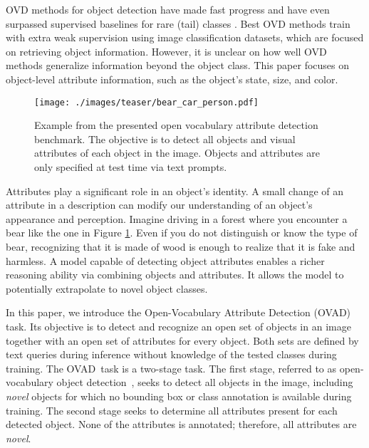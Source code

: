 \documentclass[10pt,twocolumn,letterpaper]{article}
\newcommand{\taskname}{OVAD}
\begin{document}
 
OVD methods for object detection have made fast progress and have even surpassed supervised baselines for rare (tail) classes \cite{vild}. Best OVD methods \cite{vild, detic, regionclip, bridging} train with extra weak supervision using image classification datasets, which are focused on retrieving object information.
However, it is unclear on how well OVD methods generalize information beyond the object class. This paper focuses on object-level attribute information, such as the object's state, size, and color.







\begin{figure}[t]
\texttt{[image: ./images/teaser/bear\_car\_person.pdf]}
\centering
\caption{Example from the presented open vocabulary attribute detection benchmark. The objective is to detect all objects and visual attributes of each object in the image. Objects and attributes are only specified at test time via text prompts.}
\label{fig:teaser_ovad}
\end{figure} 
Attributes play a significant role in an object's identity. A small change of an attribute in a description can modify our understanding of an object's appearance and perception. 
Imagine driving in a forest where you encounter a bear like the one in Figure \ref{fig:teaser_ovad}. Even if you do not distinguish or know the type of bear, recognizing that it is made of wood is enough to realize that it is fake and harmless. 
A model capable of detecting object attributes enables a richer reasoning ability via combining objects and attributes. It allows the model to potentially extrapolate to novel object classes.

In this paper, we introduce the Open-Vocabulary Attribute Detection (\taskname) task.
Its objective is to detect and recognize an open set of objects in an image together with an open set of attributes for every object. 
Both sets are defined by text queries during inference without knowledge of the tested classes during training.
The \taskname\ task is a two-stage task.
The first stage, referred to as open-vocabulary object detection~\cite{ovr_baseline}, seeks to detect all objects in the image,
including \textit{novel} objects for which no bounding box or class annotation is available during training. 
The second stage seeks to determine all attributes present for each detected object. None of the attributes is annotated; therefore, all attributes are \textit{novel}.
\end{document}
